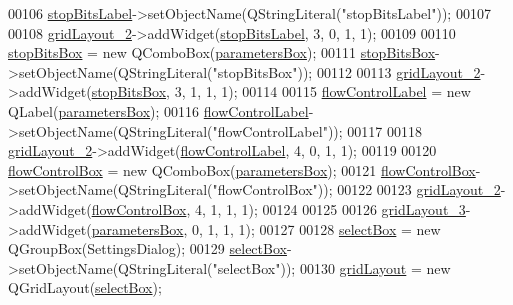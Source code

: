 \begin{DoxyCode}
00106         \hyperlink{a00082_a665748b39dda24475690e2363b72e265}{stopBitsLabel}->setObjectName(QStringLiteral(\textcolor{stringliteral}{"stopBitsLabel"}));
00107 
00108         \hyperlink{a00082_a7b71d6038a34f600625f007630c5234e}{gridLayout\_2}->addWidget(\hyperlink{a00082_a665748b39dda24475690e2363b72e265}{stopBitsLabel}, 3, 0, 1, 1);
00109 
00110         \hyperlink{a00082_ad61890c5fd0acc9e72385efd02df90c0}{stopBitsBox} = \textcolor{keyword}{new} QComboBox(\hyperlink{a00082_a47cebbe70a990bd1f309250101022889}{parametersBox});
00111         \hyperlink{a00082_ad61890c5fd0acc9e72385efd02df90c0}{stopBitsBox}->setObjectName(QStringLiteral(\textcolor{stringliteral}{"stopBitsBox"}));
00112 
00113         \hyperlink{a00082_a7b71d6038a34f600625f007630c5234e}{gridLayout\_2}->addWidget(\hyperlink{a00082_ad61890c5fd0acc9e72385efd02df90c0}{stopBitsBox}, 3, 1, 1, 1);
00114 
00115         \hyperlink{a00082_a7876a6baf43bd21d3b816f6a5a24fffc}{flowControlLabel} = \textcolor{keyword}{new} QLabel(\hyperlink{a00082_a47cebbe70a990bd1f309250101022889}{parametersBox});
00116         \hyperlink{a00082_a7876a6baf43bd21d3b816f6a5a24fffc}{flowControlLabel}->setObjectName(QStringLiteral(\textcolor{stringliteral}{"flowControlLabel"}));
00117 
00118         \hyperlink{a00082_a7b71d6038a34f600625f007630c5234e}{gridLayout\_2}->addWidget(\hyperlink{a00082_a7876a6baf43bd21d3b816f6a5a24fffc}{flowControlLabel}, 4, 0, 1, 1);
00119 
00120         \hyperlink{a00082_a1ebdf5da704108eae1078cefc446fbef}{flowControlBox} = \textcolor{keyword}{new} QComboBox(\hyperlink{a00082_a47cebbe70a990bd1f309250101022889}{parametersBox});
00121         \hyperlink{a00082_a1ebdf5da704108eae1078cefc446fbef}{flowControlBox}->setObjectName(QStringLiteral(\textcolor{stringliteral}{"flowControlBox"}));
00122 
00123         \hyperlink{a00082_a7b71d6038a34f600625f007630c5234e}{gridLayout\_2}->addWidget(\hyperlink{a00082_a1ebdf5da704108eae1078cefc446fbef}{flowControlBox}, 4, 1, 1, 1);
00124 
00125 
00126         \hyperlink{a00082_a2cc53955b73f22f0cfcf508da4654b16}{gridLayout\_3}->addWidget(\hyperlink{a00082_a47cebbe70a990bd1f309250101022889}{parametersBox}, 0, 1, 1, 1);
00127 
00128         \hyperlink{a00082_aea3871481f7ecb94f1835e519631f9a2}{selectBox} = \textcolor{keyword}{new} QGroupBox(SettingsDialog);
00129         \hyperlink{a00082_aea3871481f7ecb94f1835e519631f9a2}{selectBox}->setObjectName(QStringLiteral(\textcolor{stringliteral}{"selectBox"}));
00130         \hyperlink{a00082_a07d152c7cc63e2cffdda613baea54c0f}{gridLayout} = \textcolor{keyword}{new} QGridLayout(\hyperlink{a00082_aea3871481f7ecb94f1835e519631f9a2}{selectBox});

\end{DoxyCode}
